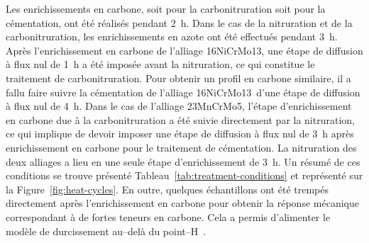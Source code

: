 Les enrichissements en carbone, soit pour la carbonitruration soit pour la cémentation, ont été réalisés pendant \SI{2}{\hour}. Dans le cas de la nitruration et de la carbonitruration, les enrichissements en azote ont été effectués pendant \SI{3}{\hour}. Après l'enrichissement en carbone de l'alliage 16NiCrMo13, une étape de diffusion à flux nul de \SI{1}{\hour} a été imposée avant la nitruration, ce qui constitue le traitement de carbonitruration. Pour obtenir un profil en carbone similaire, il a fallu faire suivre la cémentation de l'alliage 16NiCrMo13 d'une étape de diffusion à flux nul de \SI{4}{\hour}. Dans le cas de l'alliage 23MnCrMo5, l'étape d'enrichissement en carbone due à la carbonitruration a été suivie directement par la nitruration, ce qui implique de devoir imposer une étape de diffusion à flux nul de \SI{3}{\hour} après enrichissement en carbone pour le traitement de cémentation. La nitruration des deux alliages a lieu en une seule étape d'enrichissement de \SI{3}{\hour}. Un résumé de ces conditions se trouve présenté Tableau~\ref{tab:treatment-conditions} et représenté sur la Figure~\ref{fig:heat-cycles}. En outre, quelques échantillons ont été trempés directement après l'enrichissement en carbone pour obtenir la réponse mécanique correspondant à de fortes teneurs en carbone. Cela a permis d'alimenter le modèle de durcissement au--delà du point--H~\cite{Sherby2008}.

